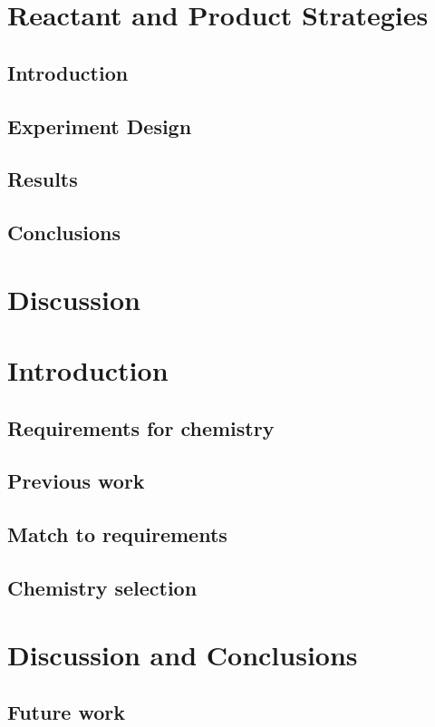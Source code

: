 \documentclass[]{report}
\begin{document}
\chapter{Reactant and Product Strategies}
\section{Introduction}
\section{Experiment Design}
\section{Results}
\section{Conclusions}

\chapter{Discussion}

\chapter{Introduction}
\section{Requirements for chemistry}
\section{Previous work}
\section{Match to requirements}
\section{Chemistry selection}

\chapter{Discussion and Conclusions}
\section{Future work}
\end{document}
